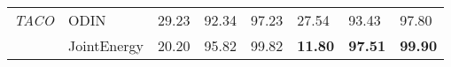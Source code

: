 \begin{table}[]
\begin{tabular}{clllllll}
\multicolumn{1}{c|}{\textit{TACO}}     & ODIN               & 29.23                         & 92.34                              & 97.23                 & 27.54                 & 93.43                & 97.80                \\
\multicolumn{1}{l|}{}                  & JointEnergy        & 20.20                         & 95.82                              & 99.82                 & \textbf{11.80}        & \textbf{97.51}       & \textbf{99.90}       \\ \hline
\end{tabular}
\label{table:idk}
\end{table}

